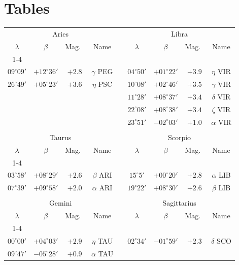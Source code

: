\section{Tables}
\begin{table}[!h]
\centering
{
\begin{tabular}{ccccccccc}
\multicolumn{4}{c}{Aries} && \multicolumn{4}{c}{Libra}\\
$\lambda$ & $\beta$ & Mag.\ & Name  && $\lambda$ & $\beta$ & Mag.\ & Name \\\cline{1-4}\cline{6-9}
&&&&&&&\\[-1.75ex]
$09^\circ 09'$ & $+12^\circ 36'$ & $+2.8$ & $\gamma$ PEG&&
$04^\circ 50'$ & $+01^\circ 22'$ & $+3.9$ & $\eta$ VIR\\
$26^\circ 49'$ & $+05^\circ 23'$ & $+3.6$ & $\eta$ PSC &&
$10^\circ 08'$ & $+02^\circ 46'$ & $+3.5$ & $\gamma$ VIR\\
&&&&&
$11^\circ 28'$ &  $+08^\circ 37'$ &  $+3.4$ & $\delta$   VIR\\
&&&&&
$22^\circ 08'$ & $+08^\circ 38'$ &  $+3.4$ & $\zeta$    VIR\\
&&&&&
$23^\circ 51'$  & $-02^\circ 03'$ &  $+1.0$ & $\alpha$   VIR\\
\multicolumn{8}{c}{}\\
\multicolumn{4}{c}{Taurus} && \multicolumn{4}{c}{Scorpio}\\
$\lambda$ & $\beta$ & Mag.\ & Name  && $\lambda$ & $\beta$ & Mag.\ & Name \\\cline{1-4}\cline{6-9}
&&&&&&&&\\[-1.75ex]
$03^\circ 58'$ &   $+08^\circ 29'$ &  $+2.6$ &  $\beta$    ARI &&
$15^\circ 5'$ &  $+00^\circ 20'$ &  $+2.8$ &   $\alpha$ LIB\\
$07^\circ 39'$ &  $+09^\circ 58'$ &  $+2.0$ &  $\alpha$   ARI &&
$19^\circ 22'$  & $+08^\circ 30'$  & $+2.6$ &  $\beta$    LIB\\
\multicolumn{8}{c}{}\\
\multicolumn{4}{c}{Gemini} && \multicolumn{4}{c}{Sagittarius}\\
$\lambda$ & $\beta$ & Mag.\ & Name  && $\lambda$ & $\beta$ & Mag.\ & Name \\\cline{1-4}\cline{6-9}
&&&&&&&&\\[-1.75ex]
$00^\circ 00'$ & $+04^\circ 03'$ &  $+2.9$ & $\eta$     TAU &&
$02^\circ 34'$  & $-01^\circ 59'$ &  $+2.3$ & $\delta$   SCO\\
$09^\circ 47'$ &  $-05^\circ 28'$ &  $+0.9$ &  $\alpha$   TAU && 

\end{tabular}}
\end{table}
